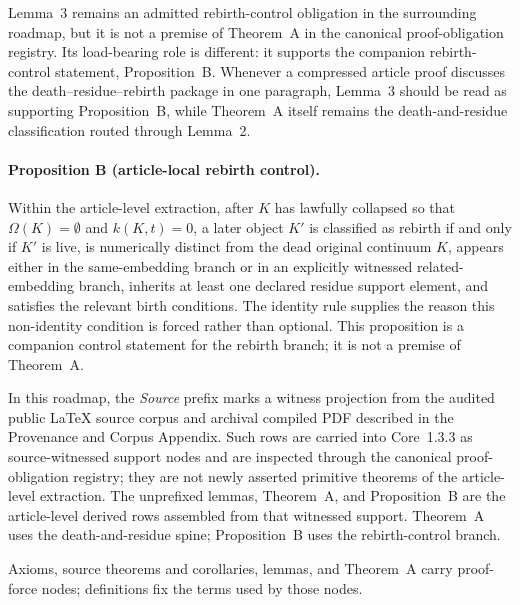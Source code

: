 Lemma~3 remains an admitted rebirth-control obligation in the surrounding
roadmap, but it is not a premise of Theorem~A in the canonical
proof-obligation registry. Its load-bearing role is different: it supports
the companion rebirth-control statement, Proposition~B. Whenever a compressed
article proof discusses the death--residue--rebirth package in one paragraph,
Lemma~3 should be read as supporting Proposition~B, while Theorem~A itself
remains the death-and-residue classification routed through Lemma~2.

\paragraph{Proposition B (article-local rebirth control).}
\label{prop:oc13-rebirth-control}
Within the article-level extraction, after \(K\) has lawfully collapsed so
that \(\Omega(K)=\emptyset\) and \(k(K,t)=0\), a later object \(K'\) is
classified as rebirth if and only if \(K'\) is live, is numerically distinct
from the dead original continuum \(K\), appears either in the same-embedding
branch or in an explicitly witnessed related-embedding branch, inherits at
least one declared residue support element, and satisfies the relevant birth
conditions. The identity rule supplies the reason this non-identity condition
is forced rather than optional. This proposition is a companion control
statement for the rebirth branch; it is not a premise of Theorem~A.

In this roadmap, the \emph{Source} prefix marks a witness projection from the
audited public LaTeX source corpus and archival compiled PDF described in the
Provenance and Corpus Appendix. Such rows are carried into Core~1.3.3 as source-witnessed
support nodes and are inspected through the canonical proof-obligation
registry; they are not newly asserted primitive theorems of the article-level
extraction. The unprefixed lemmas, Theorem~A, and Proposition~B are the
article-level derived rows assembled from that witnessed support. Theorem~A
uses the death-and-residue spine; Proposition~B uses the rebirth-control
branch.

Axioms, source theorems and corollaries, lemmas, and Theorem~A carry
proof-force nodes; definitions fix the terms used by those nodes.

